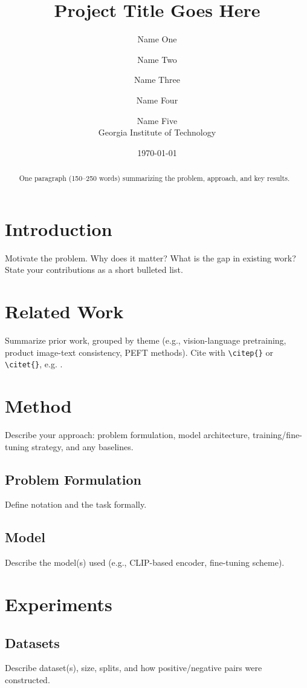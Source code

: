 \documentclass[11pt]{article}
\title{Project Title Goes Here}
\author{
  Name One \and Name Two \and Name Three \and Name Four \and Name Five \\
  \small Georgia Institute of Technology
}
\date{\today}
\begin{document}
\maketitle

\begin{abstract}
One paragraph (150--250 words) summarizing the problem, approach, and key results.
\end{abstract}

\section{Introduction}
Motivate the problem. Why does it matter? What is the gap in existing work? State your contributions as a short bulleted list.

\section{Related Work}
Summarize prior work, grouped by theme (e.g., vision-language pretraining, product image-text consistency, PEFT methods). Cite with \verb|\citep{}| or \verb|\citet{}|, e.g. \citep{example2024}.

\section{Method}
Describe your approach: problem formulation, model architecture, training/fine-tuning strategy, and any baselines.

\subsection{Problem Formulation}
Define notation and the task formally.

\subsection{Model}
Describe the model(s) used (e.g., CLIP-based encoder, fine-tuning scheme).

\section{Experiments}

\subsection{Datasets}
Describe dataset(s), size, splits, and how positive/negative pairs were constructed.
\end{document}
